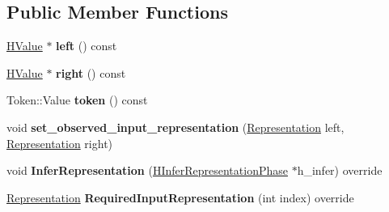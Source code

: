 \subsection*{Public Member Functions}
\begin{DoxyCompactItemize}
\item 
\hyperlink{classv8_1_1internal_1_1_h_value}{H\+Value} $\ast$ {\bfseries left} () const \hypertarget{classv8_1_1internal_1_1_h_compare_numeric_and_branch_a4a31f85adb3fa865634e6694d31007ec}{}\label{classv8_1_1internal_1_1_h_compare_numeric_and_branch_a4a31f85adb3fa865634e6694d31007ec}

\item 
\hyperlink{classv8_1_1internal_1_1_h_value}{H\+Value} $\ast$ {\bfseries right} () const \hypertarget{classv8_1_1internal_1_1_h_compare_numeric_and_branch_a4a9d4baf1b241c1e109ea24203945111}{}\label{classv8_1_1internal_1_1_h_compare_numeric_and_branch_a4a9d4baf1b241c1e109ea24203945111}

\item 
Token\+::\+Value {\bfseries token} () const \hypertarget{classv8_1_1internal_1_1_h_compare_numeric_and_branch_a5035e9844eadd44ebbf630941b1049bc}{}\label{classv8_1_1internal_1_1_h_compare_numeric_and_branch_a5035e9844eadd44ebbf630941b1049bc}

\item 
void {\bfseries set\+\_\+observed\+\_\+input\+\_\+representation} (\hyperlink{classv8_1_1internal_1_1_representation}{Representation} left, \hyperlink{classv8_1_1internal_1_1_representation}{Representation} right)\hypertarget{classv8_1_1internal_1_1_h_compare_numeric_and_branch_a249003723415949ca1bb4a110fec595e}{}\label{classv8_1_1internal_1_1_h_compare_numeric_and_branch_a249003723415949ca1bb4a110fec595e}

\item 
void {\bfseries Infer\+Representation} (\hyperlink{classv8_1_1internal_1_1_h_infer_representation_phase}{H\+Infer\+Representation\+Phase} $\ast$h\+\_\+infer) override\hypertarget{classv8_1_1internal_1_1_h_compare_numeric_and_branch_a155a70f439bbb068acfb6e17b5d5d7d6}{}\label{classv8_1_1internal_1_1_h_compare_numeric_and_branch_a155a70f439bbb068acfb6e17b5d5d7d6}

\item 
\hyperlink{classv8_1_1internal_1_1_representation}{Representation} {\bfseries Required\+Input\+Representation} (int index) override\hypertarget{classv8_1_1internal_1_1_h_compare_numeric_and_branch_af0b1dc2760a1360f845fdc7ea0b8b8af}{}\label{classv8_1_1internal_1_1_h_compare_numeric_and_branch_af0b1dc2760a1360f845fdc7ea0b8b8af}


\end{DoxyCompactItemize}
